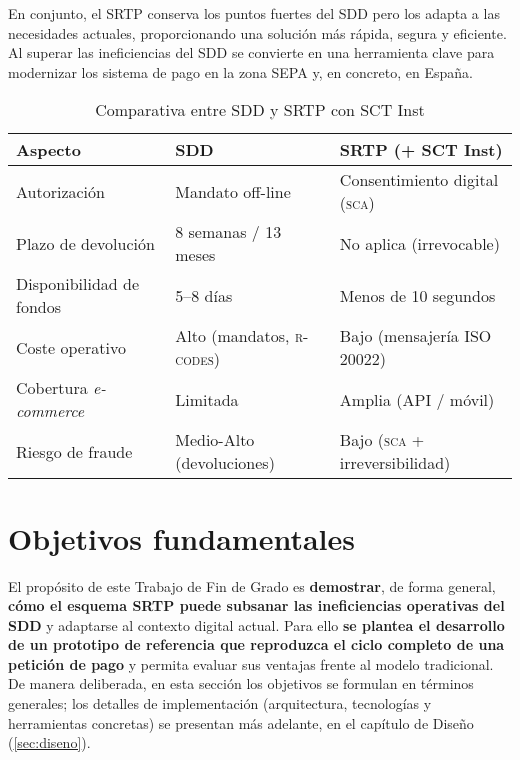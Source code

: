 En conjunto, el SRTP conserva los puntos fuertes del SDD pero los adapta a las necesidades actuales, proporcionando una solución más rápida, segura y eficiente. Al superar las ineficiencias del SDD se convierte en una herramienta clave para modernizar los sistema de pago en la zona SEPA y, en concreto, en España.
\vspace{0.5cm}

\begin{table}[h]
\centering
\caption{Comparativa entre SDD y SRTP con SCT Inst}
\label{tab:comparativa-sdd-srtp}
\renewcommand{\arraystretch}{1.2}
\begin{tabular}{@{}L{4.8cm}C{4.8cm}C{4.8cm}@{}}
\toprule
\textbf{Aspecto} & \textbf{SDD} & \textbf{SRTP (+ SCT Inst)} \\
\midrule
Autorización & Mandato off-line & Consentimiento digital (\textsc{sca}) \\
Plazo de devolución & 8 semanas / 13 meses & No aplica (irrevocable) \\
Disponibilidad de fondos & 5--8 días & Menos de 10 segundos \\
Coste operativo & Alto (mandatos, \textsc{r-codes}) & Bajo (mensajería ISO 20022) \\
Cobertura \emph{e-commerce} & Limitada & Amplia (API / móvil) \\
Riesgo de fraude & Medio-Alto (devoluciones) & Bajo (\textsc{sca} + irreversibilidad) \\
\bottomrule
\end{tabular}
\end{table}

\bigskip


\section{Objetivos fundamentales}
\label{subsec:Objetivos}
El propósito de este Trabajo de Fin de Grado es \textbf{demostrar}, de forma general, \textbf{cómo el esquema SRTP puede subsanar las ineficiencias operativas del SDD} y adaptarse al contexto digital actual. Para ello \textbf{se plantea el desarrollo de un prototipo de referencia que reproduzca el ciclo completo de una petición de pago} y permita evaluar sus ventajas frente al modelo tradicional. De manera deliberada, en esta sección los objetivos se formulan en términos generales; los detalles de implementación (arquitectura, tecnologías y herramientas concretas) se presentan más adelante, en el capítulo de Diseño (\ref{sec:diseno}).

